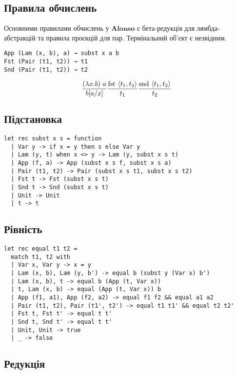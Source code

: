 \documentclass{article}
\theoremstyle{definition}
\begin{document}
\subsection{Правила обчислень}

Основними правилами обчислень у $\mathbf{Alonso}$ є бета-редукція для лямбда-абстракцій та правила проєкцій для пар. Термінальний об’єкт є незвідним.

\begin{lstlisting}[mathescape=true]
App (Lam (x, b), a) → subst x a b
Fst (Pair (t1, t2)) → t1
Snd (Pair (t1, t2)) → t2
\end{lstlisting}

$$
\frac{(\lambda x . b)\ a}{b [a/x]} \\[10pt]
\frac{\text{fst}\ \langle t_1, t_2 \rangle}{t_1} \\[10pt]
\frac{\text{snd}\ \langle t_1, t_2 \rangle}{t_2}
$$

\subsection{Підстановка}

\begin{lstlisting}[mathescape=true]
let rec subst x s = function
  | Var y -> if x = y then s else Var y
  | Lam (y, t) when x <> y -> Lam (y, subst x s t)
  | App (f, a) -> App (subst x s f, subst x s a)
  | Pair (t1, t2) -> Pair (subst x s t1, subst x s t2)
  | Fst t -> Fst (subst x s t)
  | Snd t -> Snd (subst x s t)
  | Unit -> Unit
  | t -> t
\end{lstlisting}

\subsection{Рівність}

\begin{lstlisting}[mathescape=true]
let rec equal t1 t2 =
  match t1, t2 with
  | Var x, Var y -> x = y
  | Lam (x, b), Lam (y, b') -> equal b (subst y (Var x) b')
  | Lam (x, b), t -> equal b (App (t, Var x))
  | t, Lam (x, b) -> equal (App (t, Var x)) b
  | App (f1, a1), App (f2, a2) -> equal f1 f2 && equal a1 a2
  | Pair (t1, t2), Pair (t1', t2') -> equal t1 t1' && equal t2 t2'
  | Fst t, Fst t' -> equal t t'
  | Snd t, Snd t' -> equal t t'
  | Unit, Unit -> true
  | _ -> false
\end{lstlisting}

\subsection{Редукція}
\end{document}
